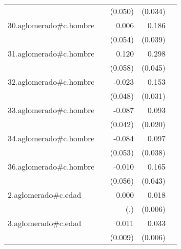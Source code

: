 {\begin{longtable}{l*{4}{D{.}{.}{-1}}}
            &                     &     (0.050)         &     (0.034)         &                     \\
\addlinespace
30.aglomerado#c.hombre&                     &       0.006         &       0.186\sym{***}&                     \\
            &                     &     (0.054)         &     (0.039)         &                     \\
\addlinespace
31.aglomerado#c.hombre&                     &       0.120\sym{*}  &       0.298\sym{***}&                     \\
            &                     &     (0.058)         &     (0.045)         &                     \\
\addlinespace
32.aglomerado#c.hombre&                     &      -0.023         &       0.153\sym{***}&                     \\
            &                     &     (0.048)         &     (0.031)         &                     \\
\addlinespace
33.aglomerado#c.hombre&                     &      -0.087\sym{*}  &       0.093\sym{***}&                     \\
            &                     &     (0.042)         &     (0.020)         &                     \\
\addlinespace
34.aglomerado#c.hombre&                     &      -0.084         &       0.097\sym{*}  &                     \\
            &                     &     (0.053)         &     (0.038)         &                     \\
\addlinespace
36.aglomerado#c.hombre&                     &      -0.010         &       0.165\sym{***}&                     \\
            &                     &     (0.056)         &     (0.043)         &                     \\
\addlinespace
2.aglomerado#c.edad&                     &       0.000         &       0.018\sym{**} &                     \\
            &                     &         (.)         &     (0.006)         &                     \\
\addlinespace
3.aglomerado#c.edad&                     &       0.011         &       0.033\sym{***}&                     \\
            &                     &     (0.009)         &     (0.006)         &                     \\

\end{longtable}}
